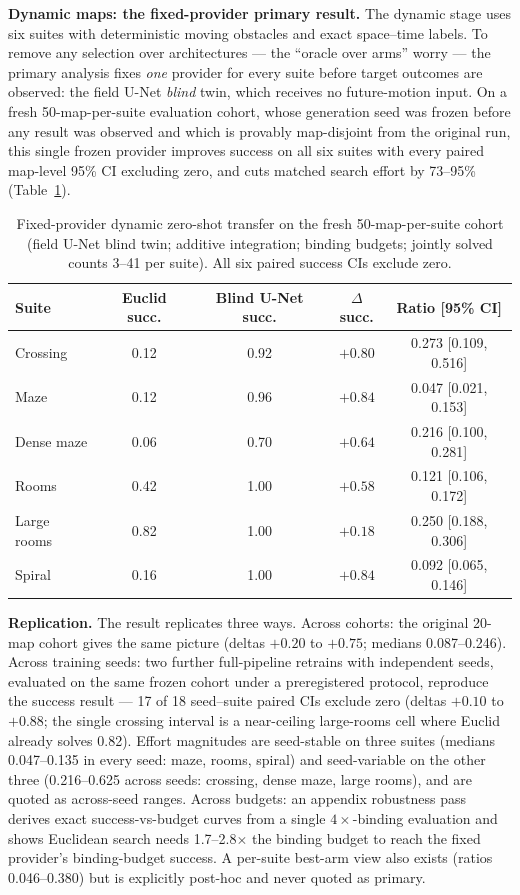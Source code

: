 \documentclass[11pt,letterpaper]{article}
\begin{document}
\textbf{Dynamic maps: the fixed-provider primary result.} The dynamic stage uses six suites with deterministic moving obstacles and exact space--time labels. To remove any selection over architectures --- the ``oracle over arms'' worry --- the primary analysis fixes \emph{one} provider for every suite before target outcomes are observed: the field U-Net \emph{blind} twin, which receives no future-motion input. On a fresh 50-map-per-suite evaluation cohort, whose generation seed was frozen before any result was observed and which is provably map-disjoint from the original run, this single frozen provider improves success on all six suites with every paired map-level 95\% CI excluding zero, and cuts matched search effort by 73--95\% (Table~\ref{tab:fixed}).

\begin{table}[t]
\centering
\small
\begin{tabular}{lcccc}
\toprule
Suite & Euclid succ. & Blind U-Net succ. & $\Delta$succ. & Ratio [95\% CI] \\
\midrule
Crossing    & 0.12 & 0.92 & $+0.80$ & 0.273 [0.109, 0.516] \\
Maze        & 0.12 & 0.96 & $+0.84$ & 0.047 [0.021, 0.153] \\
Dense maze  & 0.06 & 0.70 & $+0.64$ & 0.216 [0.100, 0.281] \\
Rooms       & 0.42 & 1.00 & $+0.58$ & 0.121 [0.106, 0.172] \\
Large rooms & 0.82 & 1.00 & $+0.18$ & 0.250 [0.188, 0.306] \\
Spiral      & 0.16 & 1.00 & $+0.84$ & 0.092 [0.065, 0.146] \\
\bottomrule
\end{tabular}
\caption{Fixed-provider dynamic zero-shot transfer on the fresh 50-map-per-suite cohort (field U-Net blind twin; additive integration; binding budgets; jointly solved counts 3--41 per suite). All six paired success CIs exclude zero.}
\label{tab:fixed}
\end{table}

\textbf{Replication.} The result replicates three ways. Across cohorts: the original 20-map cohort gives the same picture (deltas $+0.20$ to $+0.75$; medians 0.087--0.246). Across training seeds: two further full-pipeline retrains with independent seeds, evaluated on the same frozen cohort under a preregistered protocol, reproduce the success result --- 17 of 18 seed--suite paired CIs exclude zero (deltas $+0.10$ to $+0.88$; the single crossing interval is a near-ceiling large-rooms cell where Euclid already solves 0.82). Effort magnitudes are seed-stable on three suites (medians 0.047--0.135 in every seed: maze, rooms, spiral) and seed-variable on the other three (0.216--0.625 across seeds: crossing, dense maze, large rooms), and are quoted as across-seed ranges. Across budgets: an appendix robustness pass derives exact success-vs-budget curves from a single $4\times$-binding evaluation and shows Euclidean search needs 1.7--2.8$\times$ the binding budget to reach the fixed provider's binding-budget success. A per-suite best-arm view also exists (ratios 0.046--0.380) but is explicitly post-hoc and never quoted as primary.
\end{document}
